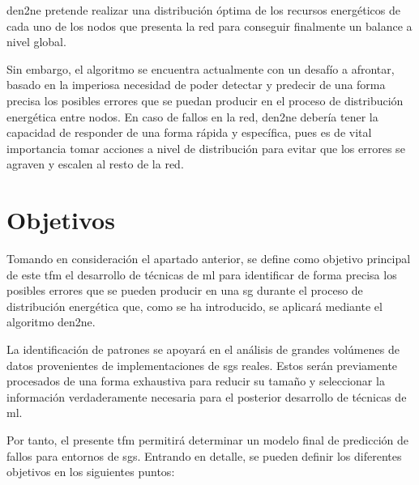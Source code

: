 \vspace{3mm}

\gls{den2ne} pretende realizar una distribución óptima de los recursos energéticos de cada uno de los nodos que presenta la red para conseguir finalmente un balance a nivel global. 


\vspace{3mm}

Sin embargo, el algoritmo se encuentra actualmente con un desafío a afrontar, basado en la imperiosa necesidad de poder detectar y predecir de una forma precisa los posibles errores que se puedan producir en el proceso de distribución energética entre nodos. En caso de fallos en la red, \gls{den2ne} debería tener la capacidad de responder de una forma rápida y específica, pues es de vital importancia tomar acciones a nivel de distribución para evitar que los errores se agraven y escalen al resto de la red.

\vspace{3mm}



\section{Objetivos}
\label{sec:obj}

Tomando en consideración el apartado anterior, se define como objetivo principal de este \gls{tfm} el desarrollo de técnicas de \gls{ml} para identificar de forma precisa los posibles errores que se pueden producir en una \gls{sg} durante el proceso de distribución energética que, como se ha introducido, se aplicará mediante el algoritmo \gls{den2ne}. 

\vspace{3mm}

La identificación de patrones se apoyará en el análisis de grandes volúmenes de datos provenientes de implementaciones de \gls{sgs} reales. Estos serán previamente procesados de una forma exhaustiva para reducir su tamaño y seleccionar la información verdaderamente necesaria para el posterior desarrollo de técnicas de \gls{ml}.

\vspace{3mm}

Por tanto, el presente \gls{tfm} permitirá determinar un modelo final de predicción de fallos para entornos de \gls{sgs}. Entrando en detalle, se pueden definir los diferentes objetivos en los siguientes puntos:


